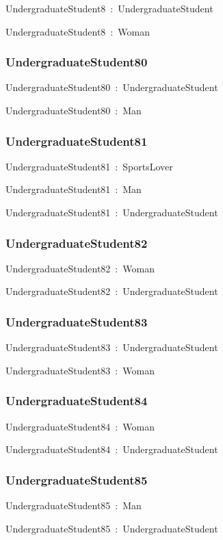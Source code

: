 \documentclass{article}
\begin{document}
UndergraduateStudent8~:~UndergraduateStudent

UndergraduateStudent8~:~Woman

\subsubsection*{UndergraduateStudent80}

UndergraduateStudent80~:~UndergraduateStudent

UndergraduateStudent80~:~Man

\subsubsection*{UndergraduateStudent81}

UndergraduateStudent81~:~SportsLover

UndergraduateStudent81~:~Man

UndergraduateStudent81~:~UndergraduateStudent

\subsubsection*{UndergraduateStudent82}

UndergraduateStudent82~:~Woman

UndergraduateStudent82~:~UndergraduateStudent

\subsubsection*{UndergraduateStudent83}

UndergraduateStudent83~:~UndergraduateStudent

UndergraduateStudent83~:~Woman

\subsubsection*{UndergraduateStudent84}

UndergraduateStudent84~:~Woman

UndergraduateStudent84~:~UndergraduateStudent

\subsubsection*{UndergraduateStudent85}

UndergraduateStudent85~:~Man

UndergraduateStudent85~:~UndergraduateStudent
\end{document}
